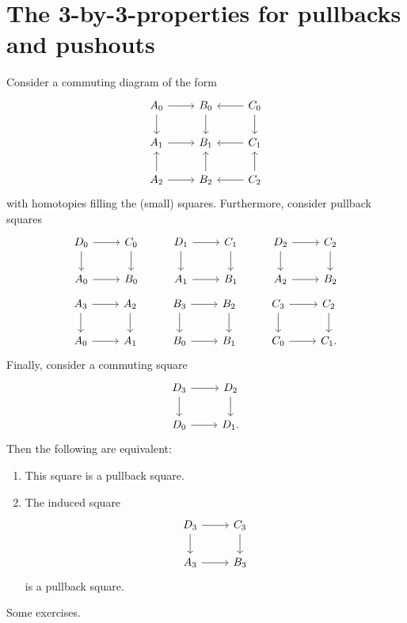 \section{The 3-by-3-properties for pullbacks and pushouts}

\begin{thm}
  Consider a commuting diagram of the form
  \begin{equation*}
    \begin{tikzcd}
      A_0 \arrow[r] \arrow[d] & B_0 \arrow[d] & C_0 \arrow[l] \arrow[d] \\
      A_1 \arrow[r] & B_1 & C_1 \arrow[l] \\
      A_2 \arrow[u] \arrow[r] & B_2 \arrow[u] & C_2 \arrow[u] \arrow[l]
    \end{tikzcd}
  \end{equation*}
  with homotopies filling the (small) squares. Furthermore, consider
  pullback squares
  \begin{equation*}
    \begin{tikzcd}
      D_0 \arrow[r] \arrow[d] & C_0 \arrow[d] & D_1 \arrow[r] \arrow[d] & C_1 \arrow[d] & D_2 \arrow[r] \arrow[d] & C_2 \arrow[d] \\
      A_0 \arrow[r] & B_0 & A_1 \arrow[r] & B_1 & A_2 \arrow[r] & B_2
    \end{tikzcd}
  \end{equation*}
  \begin{equation*}
    \begin{tikzcd}
      A_3 \arrow[r] \arrow[d] & A_2 \arrow[d] & B_3 \arrow[r] \arrow[d] & B_2 \arrow[d] & C_3 \arrow[r] \arrow[d] & C_2 \arrow[d] \\
      A_0 \arrow[r] & A_1 & B_0 \arrow[r] & B_1 & C_0 \arrow[r] & C_1.
    \end{tikzcd}
  \end{equation*}
  Finally, consider a commuting square
  \begin{equation*}
    \begin{tikzcd}
      D_3 \arrow[r] \arrow[d] & D_2 \arrow[d] \\
      D_0 \arrow[r] & D_1.
    \end{tikzcd}
  \end{equation*}
  Then the following are equivalent:
  \begin{enumerate}
  \item This square is a pullback square.
  \item The induced square
    \begin{equation*}
      \begin{tikzcd}
        D_3 \arrow[r] \arrow[d] & C_3 \arrow[d] \\
        A_3 \arrow[r] & B_3
      \end{tikzcd}
    \end{equation*}
    is a pullback square.
  \end{enumerate}
\end{thm}


\begin{exercises}
\item Some exercises.
\end{exercises}
